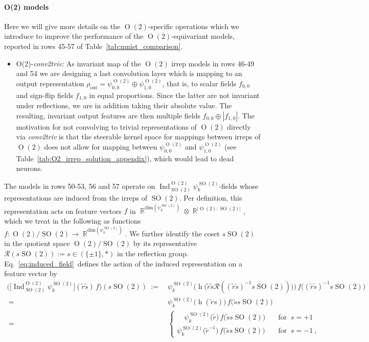 \documentclass{article}
\DeclareMathOperator*{\R}{\mathbb{R}}
\renewcommand{\O}[1]{\ensuremath{\operatorname{O}(#1)}}
\newcommand{\SO}[1]{\ensuremath{\operatorname{SO}(#1)}}
\newcommand{\Flip}{(\{\pm 1\}, *)}
\newcommand{\Ind}[2]{\ensuremath{\operatorname{Ind}_{#1}^{#2}}}
\begin{document}
\paragraph{O(2) models}

Here we will give more details on the $\O2$-specific operations which we introduce to improve the performance of the $\O2$-equivariant models, reported in rows 45-57 of Table~\ref{tab:mnist_comparison}.

\begin{itemize}[leftmargin=7ex]
\setlength{\itemindent}{-4ex}
    \item O(2)-\textit{conv2triv:}
        As invariant map of the $\O2$ irrep models in rows 46-49 and 54 we are designing a last convolution layer which is mapping to an output representation $\rho_\text{out}=\psi_{0,0}^{\O2}\oplus\psi_{1,0}^{\O2}$, that is, to scalar fields $f_{0,0}$ and sign-flip fields $f_{1,0}$ in equal proportions.
        Since the latter are not invariant under reflections, we are in addition taking their absolute value.
        The resulting, invariant output features are then multiple fields $f_{0,0}\oplus |f_{1,0}|$.
        The motivation for not convolving to trivial representations of $\O2$ directly via \textit{conv2triv} is that the steerable kernel space for mappings between irreps of $\O2$ does not allow for mapping between $\psi_{0,0}^{\O2}$ and $\psi_{1,0}^{\O2}$ (see Table~\ref{tab:O2_irrep_solution_appendix}), which would lead to dead neurons.
\end{itemize}
The models in rows 50-53, 56 and 57 operate on $\Ind{\SO2}{\O2}\psi_k^{\SO2}$-fields whose representations are induced from the irreps of $\SO2$.
Per definition, this representation acts on feature vectors $f$ in $\R^{\text{dim}(\psi_k^{\SO2})}\otimes\R^{|\O2:\SO2|}$, which we treat in the following as functions ${f:\O2/\SO2\to\R^{\text{dim}(\psi_k^{\SO2})}}$.
We further identify the coset $s\SO2$ in the quotient space $\O2/\SO2$ by its representative $\mathcal{R}(s\SO2):=s\in\Flip$ in the reflection group.
Eq.~\ref{eq:induced_field}~defines the action of the induced representation on a feature vector by
\begin{align*}
    \Big(\!\big[\Ind{\SO2}{\O2}\psi_k^{\SO2}\big](\tilde{r}\tilde{s}) \,f \Big)(s\SO2)
    \ :=&\ 
    \psi_k^{\SO2}\big(\operatorname{h}\big(\tilde{r}\tilde{s}\mathcal{R}((\tilde{r}\tilde{s})^{-1}s\SO2)\big)\big) \,f\big((\tilde{r}\tilde{s})^{-1}s\SO2\big) \\
    \  =&\ 
    \psi_k^{\SO2}\big(\operatorname{h}(\tilde{r}s)\big) \,f\big(\tilde{s}s\SO2\big) \\[2ex]
    \  =&\ 
    \begin{cases}
        \quad
        \psi_k^{\SO2}\big(\tilde{r})      \,f\big(\tilde{s}s\SO2\big) \quad& \text{for }\ s=+1 \\[1ex]
        \psi_k^{\SO2}\big(\tilde{r}^{-1}) \,f\big(\tilde{s}s\SO2\big) \quad& \text{for }\ s=-1 \ ,
    \end{cases}
\end{align*}
\end{document}
